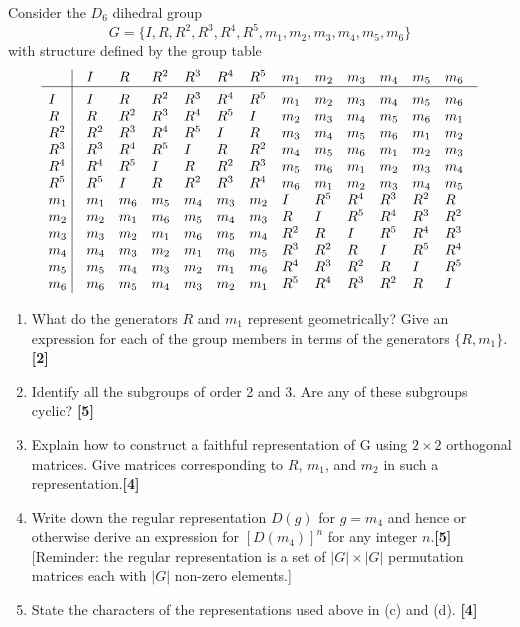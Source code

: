 \documentclass[a4paper]{article}
\begin{document}
\newpage
\begin{qns}
Consider the $D_6$ dihedral group
$$G=\{I,R,R^2,R^3,R^4,R^5,m_1,m_2,m_3,m_4,m_5,m_6\}$$
with structure defined by the group table
$$\vbox{\tabskip0.5em\offinterlineskip
    \halign{\strut$#$\hfil\ \tabskip1em\vrule&&$#$\hfil\cr
    ~   & I   & R   & R^2 & R^3 &R^4 & R^5 & m_1& m_2&m_3 & m_4&m_5& m_6    \cr
    \noalign{\hrule}\vrule height 12pt width 0pt
     I & I   & R   & R^2 & R^3 &R^4 & R^5 & m_1& m_2&m_3 & m_4&m_5& m_6    \cr
     R & R  & R^2   & R^3 & R^4 &R^5 & I & m_2& m_3&m_4 & m_5&m_6& m_1    \cr
     R^2 & R^2  & R^3   & R^4 & R^5 &I & R & m_3& m_4&m_5 & m_6&m_1& m_2    \cr
     R^3 & R^3  & R^4   & R^5 & I &R & R^2 & m_4& m_5&m_6 & m_1&m_2& m_3    \cr
     R^4 & R^4  & R^5   & I & R &R^2 & R^3 & m_5& m_6&m_1 & m_2&m_3& m_4    \cr
     R^5 & R^5  & I   & R & R^2 &R^3 & R^4 & m_6& m_1&m_2 & m_3&m_4& m_5    \cr
     m_1 & m_1  & m_6   & m_5 & m_4 & m_3 & m_2 & I& R^5&R^4 & R^3&R^2& R    \cr
     m_2  &m_2 & m_1   & m_6 & m_5 &m_4 & m_3 & R& I&R^5 & R^4 &R^3& R^2    \cr
     m_3  &m_3  & m_2   & m_1 & m_6 &m_5 & m_4 & R^2& R&I & R^5&R^4& R^3    \cr
     m_4  &m_4 & m_3   & m_2 & m_1 &m_6 & m_5 & R^3& R^2&R & I&R^5& R^4    \cr
     m_5  &m_5 & m_4   & m_3 & m_2 &m_1 & m_6 & R^4& R^3&R^2 & R&I& R^5    \cr
     m_6  &m_6  & m_5   & m_4 & m_3 &m_2 & m_1 & R^5& R^4&R^3 & R^2&R& I    \cr
}}$$
\begin{enumerate}[label=(\alph*)]
\item What do the generators $R$ and $m_1$ represent geometrically? Give an expression for each of the group members in terms of the generators $\{R,m_1\}$.\hfill\textbf{[2]}
\item Identify all the subgroups of order 2 and 3. Are any of these subgroups cyclic? \hfill\textbf{[5]}
\item Explain how to construct a faithful representation of G using $2\times 2$ orthogonal matrices. Give matrices corresponding to $R$, $m_1$, and $m_2$ in such a representation.\hfill\textbf{[4]}
\item Write down the regular representation $D(g)$ for $g = m_4$ and hence or otherwise derive an expression for $[D(m_4)]^n$ for any integer $n$.\hfill\textbf{[5]}\\[5pt]
[Reminder: the regular representation is a set of $|G|\times|G|$ permutation matrices each with $|G|$ non-zero elements.]
\item State the characters of the representations used above in (c) and (d). \hfill\textbf{[4]}
\end{enumerate}
\end{qns}
\end{document}

